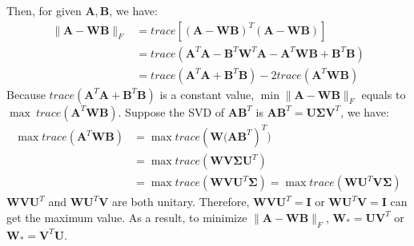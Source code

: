 \documentclass[22pt]{article}
\begin{document}
	Then, for given $\mathbf{A,B}$, we have:
	\begin{align}
		\|\mathbf{A-WB}\|_F & = trace[(\mathbf{A-WB})^T(\mathbf{A-WB})]\\
		& = trace(\mathbf{A}^T\mathbf{A} - \mathbf{B}^T\mathbf{W}^T\mathbf{A}- \mathbf{A}^T\mathbf{WB}+\mathbf{B}^T\mathbf{B})\\
		& = trace(\mathbf{A}^T\mathbf{A}+ \mathbf{B}^T\mathbf{B}) - 2trace(\mathbf{A}^T\mathbf{WB})
	\end{align}
	Because $trace(\mathbf{A}^T\mathbf{A}+ \mathbf{B}^T\mathbf{B})$ is a constant value, $\min \|\mathbf{A-WB}\|_F$ equals to $\max\ trace(\mathbf{A}^T\mathbf{WB})$. Suppose the SVD of $\mathbf{AB}^T$ is $\mathbf{AB}^T = \mathbf{U \Sigma V}^T$, we have:
	\begin{align}
		\max trace(\mathbf{A}^T\mathbf{WB}) & = \max trace(\mathbf{W(AB}^T)^T)\\
		& = \max trace(\mathbf{WV \Sigma U}^T)\\
		& = \max trace(\mathbf{WVU}^T\mathbf{\Sigma}) = \max trace(\mathbf{WU}^T\mathbf{V \Sigma})
	\end{align}
	$\mathbf{WVU}^T$ and $\mathbf{WU}^T\mathbf{V}$ are both unitary. Therefore, $\mathbf{WVU}^T = \mathbf{I}$ or $ \mathbf{WU}^T\mathbf{V} = \mathbf{I}$ can get the maximum value. As a result, to minimize $\|\mathbf{A-WB}\|_F$, $\mathbf{W}_* = \mathbf{UV}^T$ or $\mathbf{W}_* = \mathbf{V}^T\mathbf{U}$.
\end{document}
